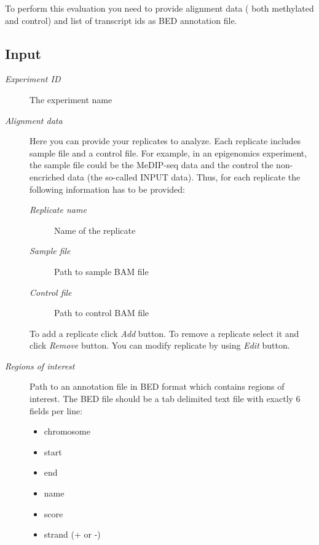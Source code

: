 \documentclass[a4paper,10pt,english]{sphinxmanual}
\begin{document}
To perform this evaluation you need to provide alignment data ( both methylated and control) and list of transcript ids as BED annotation file.


\subsection{Input}
\label{analysis:id6}\begin{description}
\item[{\emph{Experiment ID}}] \leavevmode
The experiment name

\item[{\emph{Alignment data}}] \leavevmode
Here you can provide your replicates to analyze. Each replicate includes sample file and a control file. For example, in an epigenomics experiment, the sample file could be the MeDIP-seq data and the control the non-encriched data (the so-called INPUT data). Thus, for each replicate the following information has to be provided:
\begin{description}
\item[{\emph{Replicate name}}] \leavevmode
Name of the replicate

\item[{\emph{Sample file}}] \leavevmode
Path to sample BAM file

\item[{\emph{Control file}}] \leavevmode
Path to control BAM file

\end{description}

To add a replicate click \emph{Add} button. To remove a replicate select it and click \emph{Remove} button. You can modify replicate by using \emph{Edit} button.

\item[{\emph{Regions of interest}}] \leavevmode
Path to an annotation file in BED format which contains regions of interest.
The BED file should be a tab delimited text file with exactly 6 fields per line:
\begin{itemize}
\item {} 
chromosome

\item {} 
start

\item {} 
end

\item {} 
name

\item {} 
score

\item {} 
strand (+ or -)


\end{itemize}
\end{description}
\end{document}
